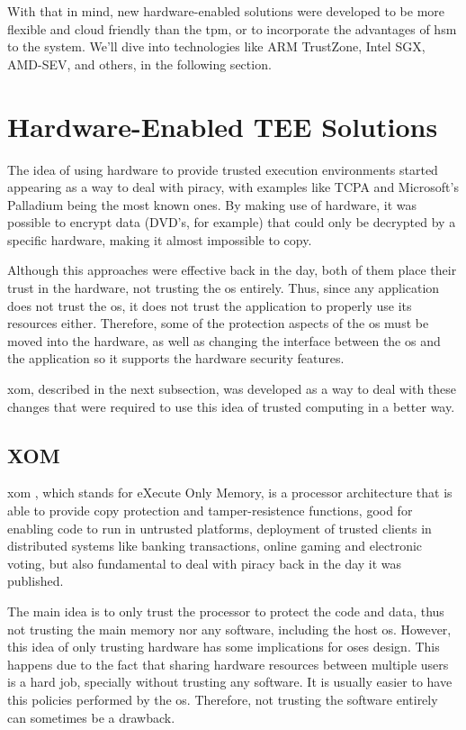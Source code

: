 With that in mind, new hardware-enabled solutions were developed to be more flexible and cloud friendly than the \gls{tpm}, or to incorporate the advantages of \gls{hsm} to the system. We'll dive into technologies like ARM TrustZone, Intel SGX, AMD-SEV, and others, in the following section.




\section{Hardware-Enabled TEE Solutions}


The idea of using hardware to provide trusted execution environments started appearing as a way to deal with piracy, with examples like TCPA \cite{tcpaPaper} and Microsoft's Palladium being the most known ones. By making use of hardware, it was possible to encrypt data (DVD's, for example) that could only be decrypted by a specific hardware, making it almost impossible to copy. 

Although this approaches were effective back in the day, both of them place their trust in the hardware, not trusting the \gls{os} entirely. 
Thus, since any application does not trust the \gls{os}, it does not trust the application to properly use its resources either. Therefore, some of the protection aspects of the \gls{os} must be moved into the hardware, as well as changing the interface between the \gls{os} and the application so it supports the hardware security features. 

\gls{xom}, described in the next subsection, was developed as a way to deal with these changes that were required to use this idea of trusted computing in a better way.

\subsection{XOM}

\gls{xom} \cite{xomPaper}, which stands for eXecute Only Memory, is a processor architecture that is able to provide copy protection and tamper-resistence functions, 
good for enabling code to run in untrusted platforms, deployment of trusted clients in distributed systems like banking transactions, online gaming and electronic voting, but also fundamental to deal with piracy back in the day it was published. 

The main idea is to only trust the processor to protect the code and data, thus not trusting the main memory nor any software, including the host \gls{os}.
However, this idea of only trusting hardware has some implications for \gls{os}es design. This happens due to the fact that sharing hardware resources between multiple users is a hard job, specially without trusting any software. It is usually easier to have this policies performed by the \gls{os}. Therefore, not trusting the software entirely can sometimes be a drawback.  

